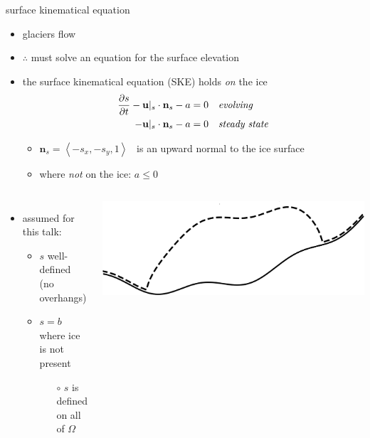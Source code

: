 \documentclass[usepdftitle=false,usenames,dvipsnames]{beamer}
\newcommand{\bn}{\mathbf{n}}
\newcommand{\bu}{\mathbf{u}}
\begin{document}
\begin{frame}{surface kinematical equation}

\begin{itemize}
\item glaciers flow
\item $\therefore$ must solve an equation for the surface elevation
\item the surface kinematical equation (SKE) holds \emph{on} the ice
\begin{align*}
\frac{\partial s}{\partial t} - \bu|_s \cdot \bn_s - a &= 0 & &\text{\emph{evolving}} \\
-\bu|_s \cdot \bn_s - a &= 0 & &\text{\emph{steady state}}
\end{align*}

    \begin{itemize}
    \item $\bn_s = \left<-s_x,-s_y,1\right>$  \, is an upward normal to the ice surface
    \item where \emph{not} on the ice: $a\le 0$
    \end{itemize}
\end{itemize}

\bigskip
\begin{columns}
        \begin{itemize}
        \item assumed for this talk:
            \begin{itemize}
            \item $s$ well-defined (no overhangs)
            \item $s=b$ where ice is not present

                \begin{itemize}
                \item[{\color{black} $\circ$}] $s$ is defined on all of $\Omega$
                \end{itemize}
            \end{itemize}
        \end{itemize}
        \includegraphics[width=1.0\textwidth]{figs/simpledomain.png}
\end{columns}
\end{frame}
\end{document}
